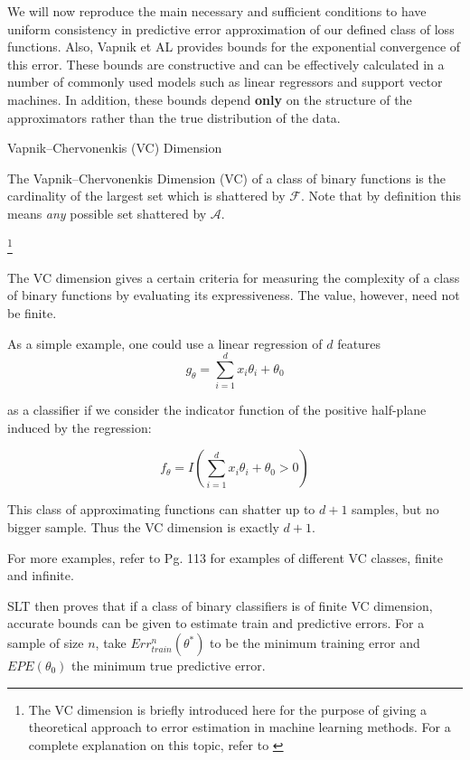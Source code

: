 We will now reproduce the main necessary and sufficient conditions to have uniform consistency in predictive error approximation of our defined class of loss functions. Also,
Vapnik et AL provides bounds for the exponential convergence of this error. These bounds are constructive and can be effectively calculated in a number of commonly used models such as linear regressors and support vector machines. In addition, these bounds depend \textbf{only} on the structure of the approximators rather than the true distribution of the data.


\begin{definition}{Vapnik--Chervonenkis (VC) Dimension}

The Vapnik--Chervonenkis Dimension (VC) of a class of binary functions is the cardinality of the largest set which is shattered by $\mathcal {F}$. Note that by definition this means \textit{any} possible set shattered by $\mathcal {A}$.
\end{definition}\footnote{The VC dimension is briefly introduced here for the purpose of giving a theoretical approach to error estimation in machine learning methods. For a complete explanation on this topic, refer to \textcite{vapnik-nature2013}}

The VC dimension gives a certain criteria for measuring the complexity of a class of binary functions by evaluating its expressiveness. The value, however, need not be finite.

As a simple example, one could use a linear regression of $d$ features 
\begin{equation}
g_{\theta} = \sum_{i=1}^d x_i \theta_i + \theta_0
\end{equation}

 as a classifier if we consider the indicator function of the positive half-plane induced by the regression: 
 
\begin{equation}
f_{\theta} = I(\sum_{i=1}^d x_i \theta_i + \theta_0 > 0)
\end{equation}

This class of approximating functions can shatter up to $d+1$ samples, but no bigger sample. Thus the VC dimension is exactly $d+1$.

For more examples, refer to \textcite{cherkassky-learning2007} Pg. 113 for examples of different VC classes, finite and infinite.

SLT then proves that if a class of binary classifiers is of finite VC dimension, accurate bounds can be given to estimate train and predictive errors. For a sample of size $n$, take $Err^n_{train}(\theta^*)$ to be the minimum training error and $EPE(\theta_0)$ the minimum true predictive error.

